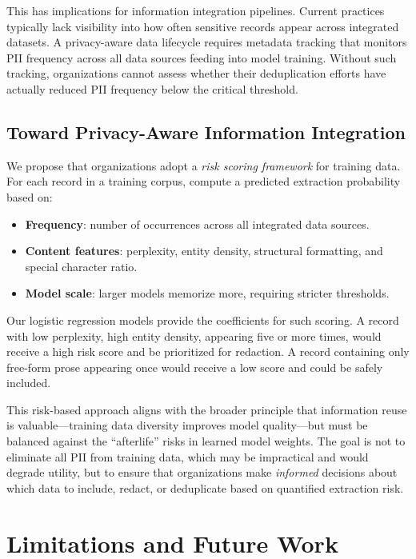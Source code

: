 \documentclass[conference]{IEEEtran}
\begin{document}
This has implications for information integration pipelines. Current practices typically lack visibility into how often sensitive records appear across integrated datasets. A privacy-aware data lifecycle requires metadata tracking that monitors PII frequency across all data sources feeding into model training. Without such tracking, organizations cannot assess whether their deduplication efforts have actually reduced PII frequency below the critical threshold.

\subsection{Toward Privacy-Aware Information Integration}

We propose that organizations adopt a \emph{risk scoring framework} for training data. For each record in a training corpus, compute a predicted extraction probability based on:

\begin{itemize}
\item \textbf{Frequency}: number of occurrences across all integrated data sources.
\item \textbf{Content features}: perplexity, entity density, structural formatting, and special character ratio.
\item \textbf{Model scale}: larger models memorize more, requiring stricter thresholds.
\end{itemize}

Our logistic regression models provide the coefficients for such scoring. A record with low perplexity, high entity density, appearing five or more times, would receive a high risk score and be prioritized for redaction. A record containing only free-form prose appearing once would receive a low score and could be safely included.

This risk-based approach aligns with the broader principle that information reuse is valuable---training data diversity improves model quality---but must be balanced against the ``afterlife'' risks in learned model weights. The goal is not to eliminate all PII from training data, which may be impractical and would degrade utility, but to ensure that organizations make \emph{informed} decisions about which data to include, redact, or deduplicate based on quantified extraction risk.

\section{Limitations and Future Work}
\label{sec:limitations}
\end{document}
